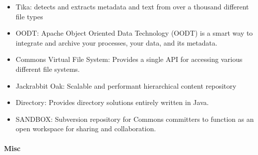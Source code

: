 \documentclass[natbib]{svjour3}
\providecommand{\tightlist}{%
  \setlength{\itemsep}{0pt}\setlength{\parskip}{0pt}}
\let\oldparagraph\paragraph
\renewcommand{\paragraph}[1]{\oldparagraph{#1}\mbox{}}
\begin{document}
\begin{itemize}
\tightlist
\item
  Tika: detects and extracts metadata and text from over a thousand
  different file types
\item
  OODT: Apache Object Oriented Data Technology (OODT) is a smart way to
  integrate and archive your processes, your data, and its metadata.
\item
  Commons Virtual File System: Provides a single API for accessing
  various different file systems.
\item
  Jackrabbit Oak: Scalable and performant hierarchical content
  repository
\item
  Directory: Provides directory solutions entirely written in Java.
\item
  SANDBOX: Subversion repository for Commons committers to function as
  an open workspace for sharing and collaboration.
\end{itemize}

\paragraph{Misc}\label{misc}
\end{document}
